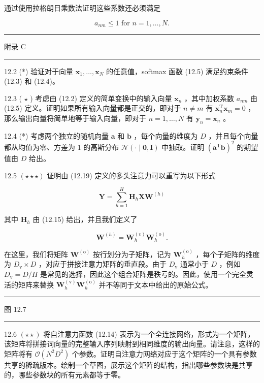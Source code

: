 \documentclass[10pt]{report}
\newcommand{\HRule}{\begin{center}\rule{0.9\linewidth}{0.2mm}\end{center}}
\begin{document}
通过使用拉格朗日乘数法证明这些系数还必须满足

\[
{a}_{nm} \leq  1\text{ for }n = 1,\ldots ,N. \tag{12.41}
\]

\HRule

附录 C

\HRule

12.2 (*) 验证对于向量 \({\mathbf{x}}_{1},\ldots ,{\mathbf{x}}_{N}\) 的任意值，softmax 函数 (12.5) 满足约束条件 (12.3) 和 (12.4)。

12.3 ( \(\star\) ) 考虑由 (12.2) 定义的简单变换中的输入向量 \({\mathbf{x}}_{n}\) ，其中加权系数 \({a}_{nm}\) 由 (12.5) 定义。证明如果所有输入向量都是正交的，即对于 \(n \neq  m\) 有 \({\mathbf{x}}_{n}^{\mathrm{T}}{\mathbf{x}}_{m} = 0\) ，那么输出向量将简单地等于输入向量，即对于 \(n = 1,\ldots ,N\) 有 \({\mathbf{y}}_{n} = {\mathbf{x}}_{n}\) 。

12.4 (*) 考虑两个独立的随机向量 \(\mathbf{a}\) 和 \(\mathbf{b}\) ，每个向量的维度为 \(D\) ，并且每个向量都从均值为零、方差为 1 的高斯分布 \(\mathcal{N}\left( {\cdot  \mid  \mathbf{0},\mathbf{I}}\right)\) 中抽取。证明 \({\left( {\mathbf{a}}^{\mathrm{T}}\mathbf{b}\right) }^{2}\) 的期望值由 \(D\) 给出。

12.5 \(\left( {\star  \star   \star  }\right)\) 证明由 (12.19) 定义的多头注意力可以重写为以下形式

\[
\mathbf{Y} = \mathop{\sum }\limits_{{h = 1}}^{H}{\mathbf{H}}_{h}\mathbf{X}{\mathbf{W}}^{\left( h\right) } \tag{12.42}
\]

其中 \({\mathbf{H}}_{h}\) 由 (12.15) 给出，并且我们定义了

\[
{\mathbf{W}}^{\left( h\right) } = {\mathbf{W}}_{h}^{\left( v\right) }{\mathbf{W}}_{h}^{\left( \mathrm{o}\right) }. \tag{12.43}
\]

在这里，我们将矩阵 \({\mathbf{W}}^{\left( \mathrm{o}\right) }\) 按行划分为子矩阵，记为 \({\mathbf{W}}_{h}^{\left( \mathrm{o}\right) }\) ，每个子矩阵的维度为 \({D}_{\mathrm{v}} \times  D\) ，对应于拼接注意力矩阵的垂直段。由于 \({D}_{\mathrm{v}}\) 通常小于 \(D\) ，例如 \({D}_{\mathrm{v}} = D/H\) 是常见的选择，因此这个组合矩阵是秩亏的。因此，使用一个完全灵活的矩阵来替换 \({\mathbf{W}}_{h}^{\left( \mathrm{v}\right) }{\mathbf{W}}_{h}^{\left( \mathrm{o}\right) }\) 并不等同于文本中给出的原始公式。

\HRule

图 12.7

\HRule

12.6 \(\left( {\star  \star  }\right)\) 将自注意力函数 (12.14) 表示为一个全连接网络，形式为一个矩阵，该矩阵将拼接词向量的完整输入序列映射到相同维度的输出向量。请注意，这样的矩阵将有 \(\mathcal{O}\left( {{N}^{2}{D}^{2}}\right)\) 个参数。证明自注意力网络对应于这个矩阵的一个具有参数共享的稀疏版本。绘制一个草图，展示这个矩阵的结构，指出哪些参数块是共享的，哪些参数块的所有元素都等于零。
\end{document}
